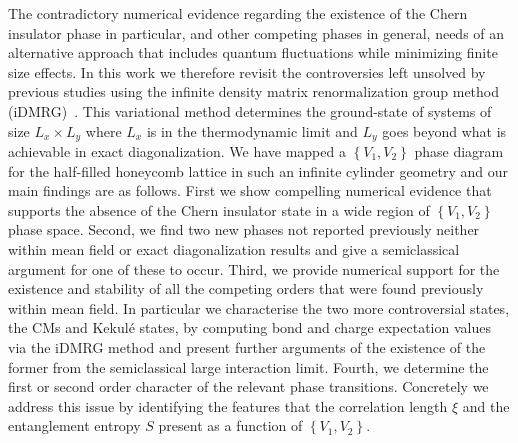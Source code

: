 \documentclass[aps,prx,10pt,twocolumn,floatfix,superscriptaddress,showpacs,numerical,footinbib]{revtex4-1}
\begin{document}
%
The contradictory numerical evidence regarding the existence of the Chern insulator phase in particular, and other competing phases in general, needs of an alternative approach
that includes quantum fluctuations while minimizing finite size effects.
%
In this work we therefore revisit the controversies left unsolved by previous studies using the infinite density matrix renormalization group method (iDMRG)~\cite{M08,W92,KZM13}. 
%
This variational method determines the ground-state of systems of size $L_{x} \times L_{y}$ where $L_{x}$ is in the thermodynamic limit and $L_{y}$ goes beyond
what is achievable in exact diagonalization.
%
We have mapped a $\left\lbrace V_{1},V_{2}\right\rbrace$ phase diagram for the half-filled honeycomb lattice in such an infinite cylinder geometry and our main findings are as follows.
%
First we show compelling numerical evidence that supports the absence of the Chern insulator state in a wide region of $\left\lbrace V_{1},V_{2}\right\rbrace$ phase space.
%
Second, we find two new phases not reported previously neither within mean field or exact diagonalization results and give a semiclassical argument for one 
of these to occur.
%
Third, we provide numerical support for the existence and stability of all the competing orders that were found previously within mean field.
%
In particular we characterise the two more controversial states, the CMs and Kekul\'{e} states, by computing bond and charge expectation values via the iDMRG method 
and present further arguments of the existence of the former from the semiclassical large interaction limit.
%
Fourth, we determine the first or second order character of the relevant phase transitions.
%
Concretely we address this issue by identifying the features that the correlation length $\xi$ and the entanglement entropy $S$ present as a function of $\left\lbrace V_{1},V_{2}\right\rbrace$.\\
\end{document}
